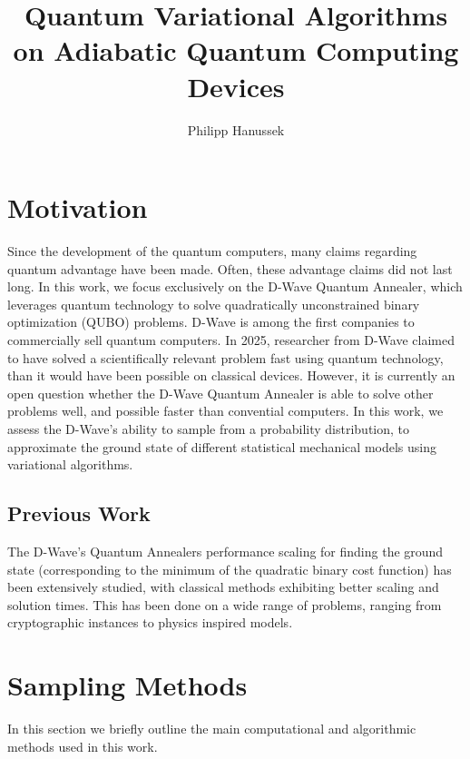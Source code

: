 \documentclass[10pt,a4paper]{article}
\author{Philipp Hanussek}
\title{Quantum Variational Algorithms on Adiabatic Quantum Computing Devices}
\begin{document}
\maketitle

\section{Motivation}
Since the development of the quantum computers, many claims regarding quantum advantage have been made. Often, these advantage claims did not last long. In this work, we focus exclusively on the D-Wave Quantum Annealer, which leverages quantum technology to solve quadratically unconstrained binary optimization (QUBO) problems. D-Wave is among the first companies to commercially sell quantum computers. In 2025, researcher from D-Wave claimed to have solved a scientifically relevant problem fast using quantum technology, than it would have been possible on classical devices. However, it is currently an open question whether the D-Wave Quantum Annealer is able to solve other problems well, and possible faster than convential computers. In this work, we assess the D-Wave's ability to sample from a probability distribution, to approximate the ground state of different statistical mechanical models using variational algorithms.  
\subsection{Previous Work}
The D-Wave's Quantum Annealers performance scaling for finding the ground state (corresponding to the minimum of the quadratic binary cost function) has been extensively studied, with classical methods exhibiting better scaling and solution times. This has been done on a wide range of problems, ranging from cryptographic instances to physics inspired models.
\section{Sampling Methods}
In this section we briefly outline the main computational and algorithmic methods used in this work.
\end{document}
